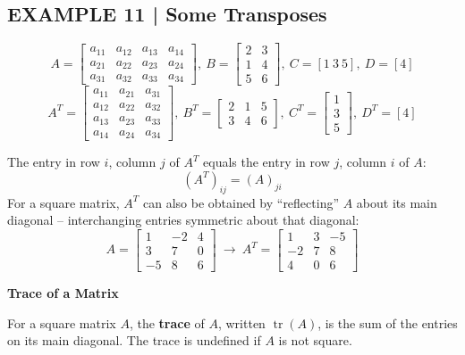 \documentclass{article}
\newcommand{\redheading}[1]{{\vspace{2mm}\noindent\Large\bfseries\color{red!55!black} #1\par}\vspace{2mm}}
\theoremstyle{mystyle}
\begin{document}
\subsection*{EXAMPLE 11 | Some Transposes}
\[
A=\begin{bmatrix}a_{11}&a_{12}&a_{13}&a_{14}\\a_{21}&a_{22}&a_{23}&a_{24}\\a_{31}&a_{32}&a_{33}&a_{34}\end{bmatrix}\!,\
B=\begin{bmatrix}2&3\\1&4\\5&6\end{bmatrix}\!,\ C=[1\ 3\ 5],\ D=[4]
\]
\[
A^T=\begin{bmatrix}a_{11}&a_{21}&a_{31}\\a_{12}&a_{22}&a_{32}\\a_{13}&a_{23}&a_{33}\\a_{14}&a_{24}&a_{34}\end{bmatrix}\!,\
B^T=\begin{bmatrix}2&1&5\\3&4&6\end{bmatrix}\!,\ C^T=\begin{bmatrix}1\\3\\5\end{bmatrix}\!,\ D^T=[4]
\]

The entry in row $i$, column $j$ of $A^T$ equals the entry in row $j$, column $i$ of $A$:
\[
(A^T)_{ij}=(A)_{ji} \tag{14}
\]
For a square matrix, $A^T$ can also be obtained by ``reflecting'' $A$ about its main diagonal -- interchanging entries symmetric about that diagonal:
\[
A=\begin{bmatrix}1&-2&4\\3&7&0\\-5&8&6\end{bmatrix}\ \longrightarrow\ A^T=\begin{bmatrix}1&3&-5\\-2&7&8\\4&0&6\end{bmatrix} \tag{15}
\]

\redheading{Trace of a Matrix}

\begin{tcolorbox}[colback=teal!4, colframe=teal!65!black, title=Definition 8, fonttitle=\bfseries, boxrule=0.5mm, arc=3mm]
For a square matrix $A$, the \textbf{trace} of $A$, written $\operatorname{tr}(A)$, is the sum of the entries on its main diagonal. The trace is undefined if $A$ is not square.
\end{tcolorbox}
\end{document}
